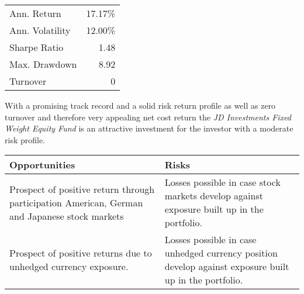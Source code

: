 \documentclass{scrreprt}
\begin{document}
\vspace{\abovedisplayskip}
\begin{minipage}{0.65\textwidth}
\end{minipage}
\begin{minipage}{0.35\textwidth}
\begin{tabular}{lr}
\toprule
Ann. Return & 17.17\%\\
Ann. Volatility & 12.00\%\\
Sharpe Ratio & 1.48 \\
Max. Drawdown & 8.92 \\
Turnover & 0\\
\bottomrule
\end{tabular}
\end{minipage}
\vspace{\belowdisplayskip}

With a promising track record and a solid risk return profile as well as zero turnover and therefore very appealing net cost return the \textit{JD Investments Fixed Weight Equity Fund} is an attractive investment for the investor with a moderate risk profile. 

\begin{table}[H]
\begin{tabularx}{\textwidth}{XX}
  \toprule
  \textbf{\textsf{Opportunities}} & \textbf{\textsf{Risks}} \\
  \midrule
Prospect of positive return through participation American, German and Japanese stock markets &
Losses possible in case stock markets develop against exposure built up in the portfolio.\\[1em]
Prospect of positive returns due to unhedged currency exposure. &
Losses possible in case unhedged currency position develop against exposure built up in the portfolio.\\
  \bottomrule
\end{tabularx}
\end{table}
\end{document}
